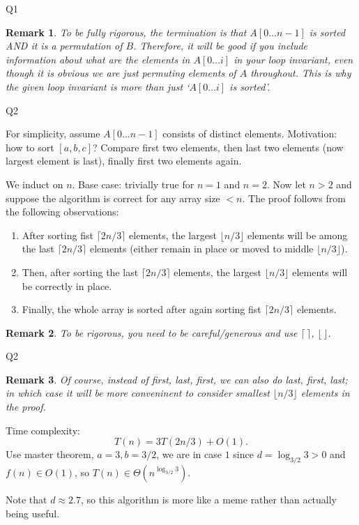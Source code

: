 \documentclass[t]{beamer}
\newtheorem{remark}{Remark}
\begin{document}
\begin{frame}{Q1}
  \begin{remark}
    To be fully rigorous, the termination is that $A[0 \dots n-1]$ is sorted AND it is a permutation of $B$. Therefore, it will be good if you include information about what are the elements in $A[0 \dots i]$ in your loop invariant, even though it is obvious we are just permuting elements of $A$ throughout. This is why the given loop invariant is more than just `$A[0\dots i]$ is sorted'. 
  \end{remark}
\end{frame}
\begin{frame}[fragile]{Q2}
  \iffalse StoogeSort on array $A[0\dots N-1]$:
  \begin{lstlisting}
    if n=2 and A[0]>A[1] then
      Swap A[0] and A[1]

    if n>2 then 
      Apply StoogeSort to sort the first 
  \end{lstlisting}
  \fi 
  For simplicity, assume $A[0 \dots n-1]$ consists of distinct elements. 
  Motivation: how to sort $[a, b, c]$? Compare first two elements, then last two elements (now largest element is last), finally first two elements again. 
  \par We induct on $n$. Base case: trivially true for $n=1$ and $n=2$. Now let $n>2$ and suppose the algorithm is correct for any array size $<n$. The proof follows from the following observations: 
  \begin{enumerate}
    \item After sorting fist $\lceil 2n/3\rceil$ elements, the largest $\lfloor n/3 \rfloor$ elements will be among the last $\lceil 2n/3\rceil$ elements (either remain in place or moved to middle $\lfloor n/3 \rfloor$). 
    \item Then, after sorting the last $\lceil 2n/3\rceil$ elements, the largest $\lfloor n/3 \rfloor$ elements will be correctly in place. 
    \item Finally, the whole array is sorted after again sorting fist $\lceil 2n/3\rceil$ elements. 
  \end{enumerate}
  \begin{remark}
    To be rigorous, you need to be careful/generous and use $\lceil \,\rceil$, $\lfloor \, \rfloor$. 
  \end{remark}
\end{frame}
\begin{frame}{Q2}
  \begin{remark}
    Of course, instead of first, last, first, we can also do last, first, last; in which case it will be more conveninent to consider smallest $\lfloor n/3 \rfloor$ elements in the proof. 
  \end{remark}
  Time complexity: 
  \[T(n) = 3T(2n/3)+O(1). \]
  Use master theorem, $a=3, b=3/2$, we are in case $1$ since $d=\log_{3/2}{3}>0$ and $f(n) \in O(1)$, so $T(n) \in \Theta(n^{\log_{3/2}{3}})$.
  \par Note that $d \approx 2.7$, so this algorithm is more like a meme rather than actually being useful.  
\end{frame}
\end{document}
